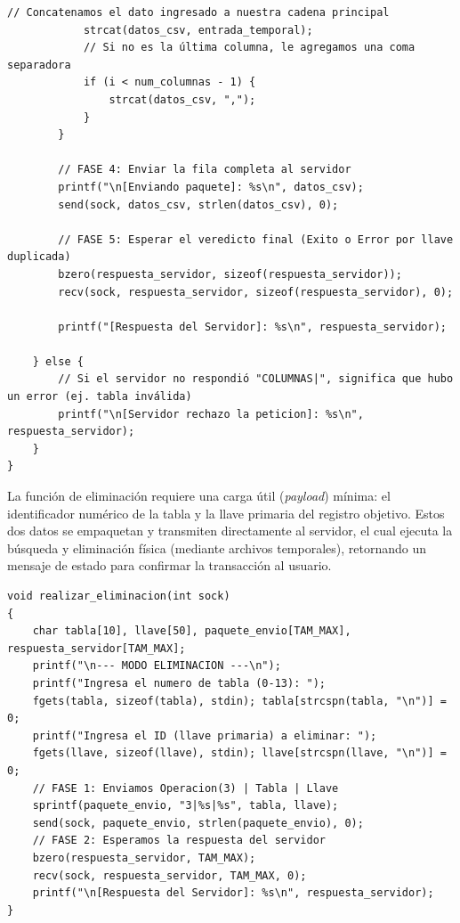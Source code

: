\documentclass[12pt]{article}
\begin{document}
\begin{lstlisting}[style=estiloC ,title={Código 3. Cliente TCP (INSERCION)}]
            // Concatenamos el dato ingresado a nuestra cadena principal
            strcat(datos_csv, entrada_temporal);
            // Si no es la última columna, le agregamos una coma separadora
            if (i < num_columnas - 1) {
                strcat(datos_csv, ",");
            }
        }

        // FASE 4: Enviar la fila completa al servidor
        printf("\n[Enviando paquete]: %s\n", datos_csv);
        send(sock, datos_csv, strlen(datos_csv), 0);

        // FASE 5: Esperar el veredicto final (Exito o Error por llave duplicada)
        bzero(respuesta_servidor, sizeof(respuesta_servidor));
        recv(sock, respuesta_servidor, sizeof(respuesta_servidor), 0);

        printf("[Respuesta del Servidor]: %s\n", respuesta_servidor);

    } else {
        // Si el servidor no respondió "COLUMNAS|", significa que hubo un error (ej. tabla inválida)
        printf("\n[Servidor rechazo la peticion]: %s\n", respuesta_servidor);
    }
}
\end{lstlisting}

La función de eliminación requiere una carga útil (\textit{payload}) mínima: el identificador numérico de la tabla y la llave primaria del registro objetivo. Estos dos datos se empaquetan y transmiten directamente al servidor, el cual ejecuta la búsqueda y eliminación física (mediante archivos temporales), retornando un mensaje de estado para confirmar la transacción al usuario.

\begin{lstlisting}[style=estiloC ,title={Código 4. Cliente TCP (ELIMINACION)}]
void realizar_eliminacion(int sock) 
{
    char tabla[10], llave[50], paquete_envio[TAM_MAX], respuesta_servidor[TAM_MAX];
    printf("\n--- MODO ELIMINACION ---\n");
    printf("Ingresa el numero de tabla (0-13): ");
    fgets(tabla, sizeof(tabla), stdin); tabla[strcspn(tabla, "\n")] = 0;
    printf("Ingresa el ID (llave primaria) a eliminar: ");
    fgets(llave, sizeof(llave), stdin); llave[strcspn(llave, "\n")] = 0;
    // FASE 1: Enviamos Operacion(3) | Tabla | Llave
    sprintf(paquete_envio, "3|%s|%s", tabla, llave);
    send(sock, paquete_envio, strlen(paquete_envio), 0);
    // FASE 2: Esperamos la respuesta del servidor
    bzero(respuesta_servidor, TAM_MAX);
    recv(sock, respuesta_servidor, TAM_MAX, 0);
    printf("\n[Respuesta del Servidor]: %s\n", respuesta_servidor);
}
\end{lstlisting}
\end{document}
